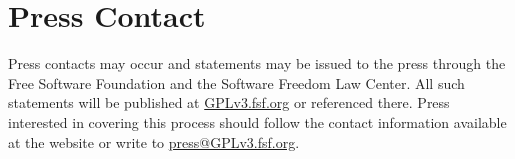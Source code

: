 \section{Press Contact}

Press contacts may occur and statements may be issued to the press
through the Free Software Foundation and the Software Freedom Law
Center. All such statements will be published at \url{GPLv3.fsf.org} or
referenced there. Press interested in covering this process should
follow the contact information available at the website or write to
\href{maito:press@GPLv3.fsf.org}{press@GPLv3.fsf.org}.
